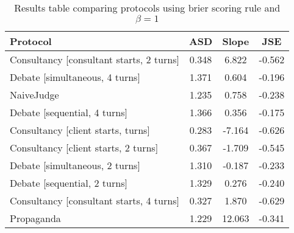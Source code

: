 \begin{table}[h]
\centering
\begin{tabular}{lccc}
\toprule
Protocol & ASD & Slope & JSE \\
\midrule
Consultancy [consultant starts, 2 turns] & 0.348 & 6.822 & -0.562 \\
Debate [simultaneous, 4 turns] & 1.371 & 0.604 & -0.196 \\
NaiveJudge & 1.235 & 0.758 & -0.238 \\
Debate [sequential, 4 turns] & 1.366 & 0.356 & -0.175 \\
Consultancy [client starts, turns] & 0.283 & -7.164 & -0.626 \\
Consultancy [client starts, 2 turns] & 0.367 & -1.709 & -0.545 \\
Debate [simultaneous, 2 turns] & 1.310 & -0.187 & -0.233 \\
Debate [sequential, 2 turns] & 1.329 & 0.276 & -0.240 \\
Consultancy [consultant starts, 4 turns] & 0.327 & 1.870 & -0.629 \\
Propaganda & 1.229 & 12.063 & -0.341 \\
\bottomrule
\end{tabular}
\caption{Results table comparing protocols using brier scoring rule and $\beta=1$}
\label{tab:protocol-comparison}
\end{table}